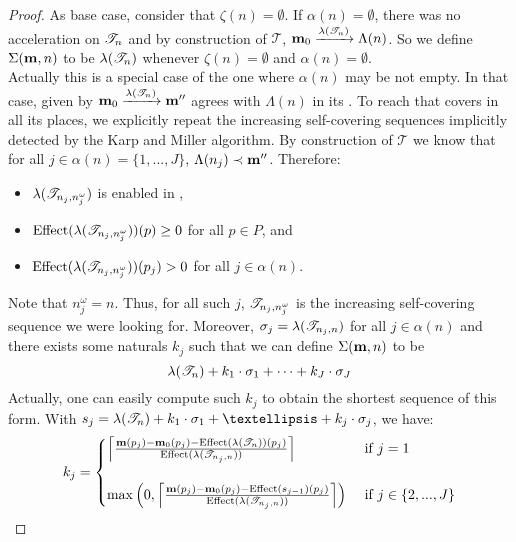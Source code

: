 \begin{proof}
  As base case, consider that $\zeta(n) = \emptyset$.
  If $\alpha(n) = \emptyset$, there was no acceleration on $\mathscr{T}_{n}$ and by construction of $\mathcal{T}$, $\mathbf{m}_0 \xrightarrow{\lambda(\mathscr{T}_{n})} \Lambda(n)$.
  So we define $\Sigma(\mathbf{m}, n)$ to be $\lambda(\mathscr{T}_{n})$ whenever $\zeta(n) = \emptyset$ and $\alpha(n) = \emptyset$.\\
  Actually this is a special case of the one where $\alpha(n)$ may be not empty.
  In that case, \marpp given by $\mathbf{m}_0 \xrightarrow{\lambda(\mathscr{T}_{n})} \mathbf{m''}$ agrees with $\Lambda(n)$ in its \noplaces.
  To reach \marp that covers \mar in all its places, we explicitly repeat the increasing self-covering sequences implicitly detected by the Karp and Miller algorithm.
  By construction of $\mathcal{T}$ we know that for all $j \in \alpha(n) = \{1, ..., J\}$, $\Lambda(n_j) \prec \mathbf{m''}$.
  Therefore:
  \begin{itemize}
    \item $\lambda(\mathscr{T}_{n_j,n^\omega_j})$ is enabled in \marpp,
    \item $\operatorname{Effect}(\lambda(\mathscr{T}_{n_j,n^\omega_j}))(p) \geq 0$ for all $p \in P$, and
    \item $\operatorname{Effect}(\lambda(\mathscr{T}_{n_j,n^\omega_j}))(p_j) > 0$ for all $j \in \alpha(n)$.
  \end{itemize}
  Note that $n^\omega_j = n$.
  Thus, for all such $j$, $\mathscr{T}_{n_j,n^\omega_j}$ is the increasing self-covering sequence we were looking for.
  Moreover, %
  $\sigma_j = \lambda(\mathscr{T}_{n_j,n})$ for all $j \in \alpha(n)$
  and
  there exists some naturals $k_j$ such that we can define $\Sigma(\mathbf{m}, n)$ to be
  \[ \lambda(\mathscr{T}_{n}) + k_1 \cdot \sigma_1 + \dots + k_J \cdot \sigma_J \] 
  Actually, one can easily compute such $k_j$ to obtain the shortest sequence of this form.
  With $s_j = \lambda(\treepath{n}) + k_1 \cdot \sigma_1 + … + k_j \cdot \sigma_j$, we have:
  \[
    k_j =
    \begin{cases}
      \left\lceil
        \frac{\mathbf{m}(p_j) - \mathbf{m}_0(p_j) - \operatorname{Effect}(\lambda(\mathscr{T}_{n}))(p_j)}
            {\operatorname{Effect}(\lambda(\mathscr{T}_{n_j,n}))}
      \right\rceil
      &\text{ if } j = 1\\
      \\
      \max\left(0,
        \left\lceil
          \frac{\mathbf{m}(p_j) - \mathbf{m}_0(p_j) - \operatorname{Effect}(s_{j-1})(p_j)}
              {\operatorname{Effect}(\lambda(\mathscr{T}_{n_j,n}))}
        \right\rceil
      \right)
      &\text{ if } j \in \{2, ..., J\}
    \end{cases}
  \]


\end{proof}
